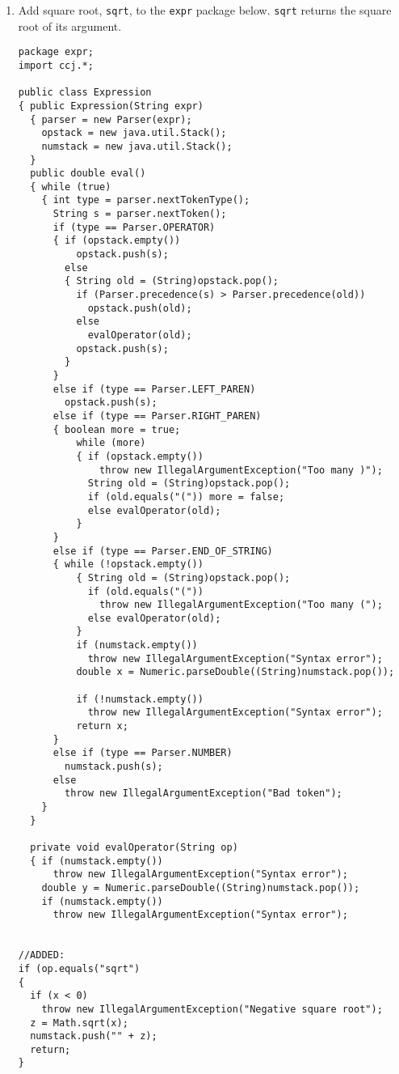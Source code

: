 \begin{enumerate}
\begin{enumerate}
                        \item Add square root, {\tt sqrt}, 
			    to the {\tt expr} package
			    below.  {\tt sqrt} returns
			    the square root of its argument.
\begin{verbatim}
package expr;
import ccj.*;

public class Expression
{ public Expression(String expr)
  { parser = new Parser(expr);
    opstack = new java.util.Stack();
    numstack = new java.util.Stack();
  }
  public double eval()
  { while (true)
    { int type = parser.nextTokenType();
      String s = parser.nextToken();
      if (type == Parser.OPERATOR)
      { if (opstack.empty())
          opstack.push(s);
        else
        { String old = (String)opstack.pop();
          if (Parser.precedence(s) > Parser.precedence(old))
            opstack.push(old);
          else
            evalOperator(old);
          opstack.push(s);
        }
      }
      else if (type == Parser.LEFT_PAREN)
        opstack.push(s);
      else if (type == Parser.RIGHT_PAREN)
      { boolean more = true;
          while (more)
          { if (opstack.empty())
              throw new IllegalArgumentException("Too many )");
            String old = (String)opstack.pop();
            if (old.equals("(")) more = false;
            else evalOperator(old);
          }
      }
      else if (type == Parser.END_OF_STRING)
      { while (!opstack.empty())
          { String old = (String)opstack.pop();
            if (old.equals("("))
              throw new IllegalArgumentException("Too many (");
            else evalOperator(old);
          }
          if (numstack.empty())
            throw new IllegalArgumentException("Syntax error");
          double x = Numeric.parseDouble((String)numstack.pop());
         
          if (!numstack.empty())
            throw new IllegalArgumentException("Syntax error");
          return x;
      }
      else if (type == Parser.NUMBER)
        numstack.push(s);
      else
        throw new IllegalArgumentException("Bad token");
    }
  }

  private void evalOperator(String op)
  { if (numstack.empty())
      throw new IllegalArgumentException("Syntax error");
    double y = Numeric.parseDouble((String)numstack.pop());
    if (numstack.empty())
      throw new IllegalArgumentException("Syntax error");
      
      
//ADDED:
if (op.equals("sqrt") 
{
  if (x < 0)
    throw new IllegalArgumentException("Negative square root");
  z = Math.sqrt(x);
  numstack.push("" + z);
  return;
}
    

\end{verbatim}
\end{enumerate}
\end{enumerate}
